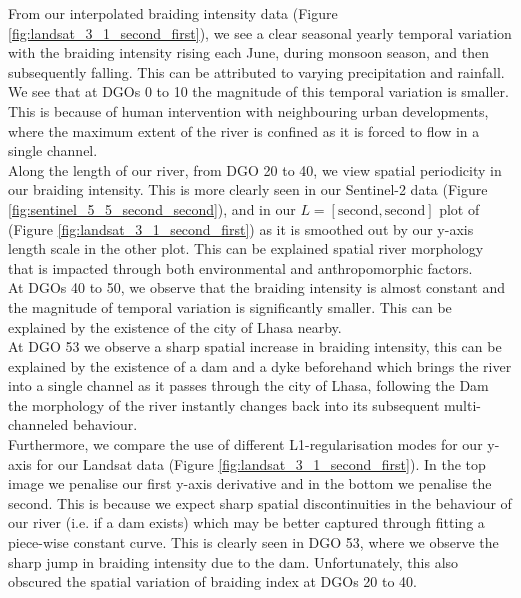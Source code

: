 \documentclass[12pt]{article}
\begin{document}
From our interpolated braiding intensity data (Figure \ref{fig:landsat_3_1_second_first}), we see a clear seasonal yearly temporal variation with the braiding intensity rising each June, during monsoon season, and then subsequently falling. This can be attributed to varying precipitation and rainfall. We see that at DGOs 0 to 10 the magnitude of this temporal variation is smaller. This is because of human intervention with neighbouring urban developments, where the maximum extent of the river is confined as it is forced to flow in a single channel. \\

Along the length of our river, from DGO 20 to 40, we view spatial periodicity in our braiding intensity. This is more clearly seen in our Sentinel-2 data (Figure \ref{fig:sentinel_5_5_second_second}), and in our $L=[\text{second},\text{second}]$ plot of (Figure \ref{fig:landsat_3_1_second_first}) as it is smoothed out by our y-axis length scale in the other plot. This can be explained spatial river morphology that is impacted through both environmental and anthropomorphic factors. \\

At DGOs 40 to 50, we observe that the braiding intensity is almost constant and the magnitude of temporal variation is significantly smaller. This can be explained by the existence of the city of Lhasa nearby. \\

At DGO 53 we observe a sharp spatial increase in braiding intensity, this can be explained by the existence of a dam and a dyke beforehand which brings the river into a single channel as it passes through the city of Lhasa, following the Dam the morphology of the river instantly changes back into its subsequent multi-channeled behaviour. \\

Furthermore, we compare the use of different L1-regularisation modes for our y-axis for our Landsat data (Figure \ref{fig:landsat_3_1_second_first}). In the top image we penalise our first y-axis derivative and in the bottom we penalise the second. This is because we expect sharp spatial discontinuities in the behaviour of our river (i.e. if a dam exists) which may be better captured through fitting a piece-wise constant curve. This is clearly seen in DGO 53, where we observe the sharp jump in braiding intensity due to the dam. Unfortunately, this also obscured the spatial variation of braiding index at DGOs 20 to 40. \\
\end{document}
